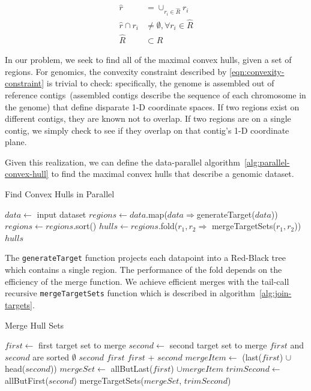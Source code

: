 \documentclass{acm_proc_article-sp}
\begin{document}
\begin{align}
\label{eqn:convexity-constraint}
\hat{r} &= \cup_{r_i \in \hat{R}} r_i \\
\hat{r} \cap r_i &\ne \emptyset, \forall r_i \in \hat{R} \\
\hat{R} &\subset R
\end{align}

In our problem, we seek to find all of the maximal convex hulls, given a set of regions. For genomics, the
convexity constraint described by \eqref{eqn:convexity-constraint} is trivial to check: specifically, the
genome is assembled out of reference contigs~(assembled contigs describe the sequence of each
chromosome in the genome) that define disparate 1-D coordinate spaces. If two regions exist on different contigs,
they are known not to overlap. If two regions are on a single contig, we simply check to see if they overlap
on that contig's 1-D coordinate plane.

Given this realization, we can define the data-parallel algorithm~\ref{alg:parallel-convex-hull} to find the
maximal convex hulls that describe a genomic dataset.

\begin{algorithm}
\caption{Find Convex Hulls in Parallel}
\label{alg:parallel-convex-hull}
\begin{algorithmic}
\STATE $data \leftarrow$ input dataset
\STATE $regions \leftarrow data$.map($data \Rightarrow $generateTarget($data$))
\STATE $regions \leftarrow regions$.sort()
\STATE $hulls \leftarrow regions$.fold($r_1, r_2 \Rightarrow$ mergeTargetSets($r_1, r_2$))
\RETURN $hulls$
\end{algorithmic}
\end{algorithm}

The \texttt{generateTarget} function projects each datapoint into a Red-Black tree which contains a
single region. The performance of the fold depends on the efficiency of the merge function. We achieve
efficient merges with the tail-call recursive \texttt{mergeTargetSets} function which is described in
algorithm~\ref{alg:join-targets}.

\begin{algorithm}
\caption{Merge Hull Sets}
\label{alg:join-targets}
\begin{algorithmic}
\STATE $first \leftarrow$ first target set to merge
\STATE $second \leftarrow$ second target set to merge
\REQUIRE $first$ and $second$ are sorted
\RETURN $\emptyset$
\RETURN $second$
\RETURN $first$
\ELSE
{}
\RETURN $first$ + $second$
\ELSE
\STATE $mergeItem \leftarrow$ (last($first$) $\cup$ head($second$))
\STATE $mergeSet \leftarrow$ allButLast($first$) $\cup mergeItem$
\STATE $trimSecond \leftarrow$ allButFirst($second$)
\RETURN mergeTargetSets($mergeSet$, $trimSecond$)
\ENDIF
\ENDIF
\end{algorithmic}
\end{algorithm}
\end{document}
